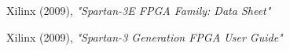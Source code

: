 \clearpage{\pagestyle{empty}\cleardoublepage}
\begin{thebibliography}{3}


 Xilinx (2009), \emph{"Spartan-3E FPGA Family: Data Sheet"}

 Xilinx (2009), \emph{"Spartan-3 Generation FPGA User Guide"}



\end{thebibliography} 
